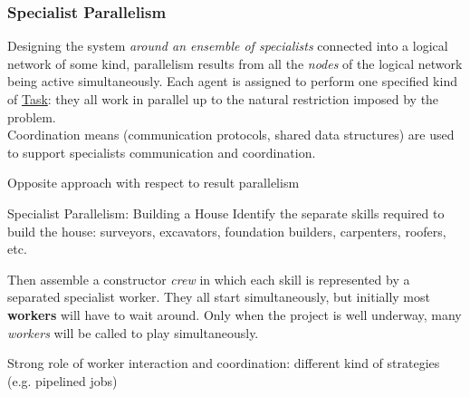 \subsubsection{Specialist Parallelism}\label{sub:ed_specialist_parallelism} %
Designing the system \textit{around an ensemble of specialists} connected into a logical network of some kind, parallelism results from all the \textit{nodes} of the logical network being active simultaneously.
\emptyln{}
Each agent is assigned to perform one specified kind of \hyperref[def:task]{Task}: they all work in parallel up to the natural restriction imposed by the problem.
\\
Coordination means (communication protocols, shared data structures) are used to support specialists communication and coordination.
\begin{note}
    Opposite approach with respect to result parallelism
\end{note}
\begin{example}{Specialist Parallelism: Building a House}{}
    Identify the separate skills required to build the house: surveyors, excavators, foundation builders, carpenters, roofers, etc.
    \begin{note}
    \end{note}
    Then assemble a constructor \textit{crew} in which each skill is represented by a separated specialist worker.
    \emptyln{}
    They all start simultaneously, but initially most \textbf{workers} will have to wait around.
    Only when the project is well underway, many \textit{workers} will be called to play simultaneously.
    \begin{warning}
        Strong role of worker interaction and coordination: different kind of strategies (e.g. pipelined jobs)
    \end{warning}
\end{example}
%
